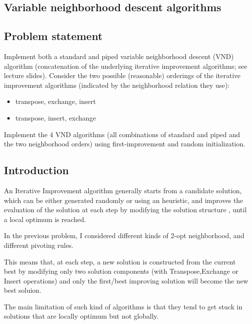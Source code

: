 
\newpage
\begin{homeworkProblem}
\section{Variable neighborhood descent algorithms}
\subsection{Problem statement}
Implement both a standard and piped variable neighborhood descent (VND) algorithm (concatenation of the underlying iterative improvement algorithms; see lecture slides). Consider the two possible (reasonable) orderings of
the iterative improvement algorithms (indicated by the neighborhood relation they use):
\begin{itemize}
  \item transpose, exchange, insert
  \item transpose, insert, exchange 
\end{itemize}
Implement the 4 VND algorithms (all combinations of standard and piped and the two neighborhood orders) using first-improvement and random initialization.

\subsection{Introduction}
An Iterative Improvement algorithm generally starts from a candidate solution, which can be either generated randomly or using an heuristic, and improves the evaluation of the solution at each step by modifying the solution structure , until a local optimum is reached.

In the previous problem, I considered different kinds of 2-opt neighborhood, and different pivoting rules.

This means that, at each step, a new solution is constructed from the current best by modifying only two solution components (with Transpose,Exchange or Insert operations) and only the first/best improving solution will become the new best soluion.

The main limitation of such kind of algorithms is that they tend to get stuck in solutions that are locally optimum but not globally.


\end{homeworkProblem}
